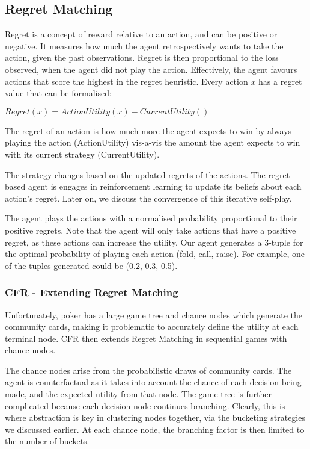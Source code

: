 \documentclass{article}
\begin{document}
\subsection{Regret Matching}

Regret is a concept of reward relative to an action, and can be positive or negative. It measures how much the agent retrospectively wants to take the action, given the past observations. Regret is then proportional to the loss observed, when the agent did not play the action. Effectively, the agent favours actions that score the highest in the regret heuristic. Every action $x$ has a regret value that can be formalised:

\begin{center}
$Regret(x) = ActionUtility(x) - CurrentUtility()$
\end{center}

The regret of an action is how much more the agent expects to win by always playing the action (ActionUtility) vis-a-vis the amount the agent expects to win with its current strategy (CurrentUtility).

The strategy changes based on the updated regrets of the actions. The regret-based agent is engages in reinforcement learning to update its beliefs about each action's regret. Later on, we discuss the convergence of this iterative self-play.

The agent plays the actions with a normalised probability proportional to their positive regrets. Note that the agent will only take actions that have a positive regret, as these actions can increase the utility. Our agent generates a 3-tuple for the optimal probability of playing each action (fold, call, raise). For example, one of the tuples generated could be (0.2, 0.3, 0.5).

\subsubsection{CFR - Extending Regret Matching}

Unfortunately, poker has a large game tree and chance nodes which generate the community cards, making it problematic to accurately define the utility at each terminal node. CFR then extends Regret Matching in sequential games with chance nodes.

The chance nodes arise from the probabilistic draws of community cards. The agent is counterfactual as it takes into account the chance of each decision being made, and the expected utility from that node. The game tree is further complicated because each decision node continues branching. Clearly, this is where abstraction is key in clustering nodes together, via the bucketing strategies we discussed earlier. At each chance node, the branching factor is then limited to the number of buckets.
\end{document}
